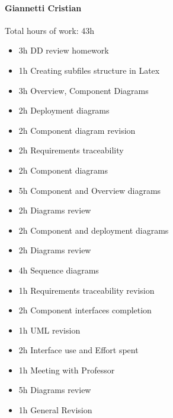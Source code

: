\documentclass{report}
\begin{document}
		\paragraph{Giannetti Cristian} Total hours of work: 43h
			\begin{itemize}
				\item 3h DD review homework
				\item 1h Creating subfiles structure in Latex
				\item 3h Overview, Component Diagrams
				\item 2h Deployment diagrams
				\item 2h Component diagram revision
				\item 2h Requirements traceability
				\item 2h Component diagrams
				\item 5h Component and Overview diagrams
				\item 2h Diagrams review
				\item 2h Component and deployment diagrams
				\item 2h Diagrams review
				\item 4h Sequence diagrams
				\item 1h Requirements traceability revision
				\item 2h Component interfaces completion
				\item 1h UML revision
				\item 2h Interface use and Effort spent
				\item 1h Meeting with Professor
				\item 5h Diagrams review
				\item 1h General Revision 
			\end{itemize}
\end{document}
